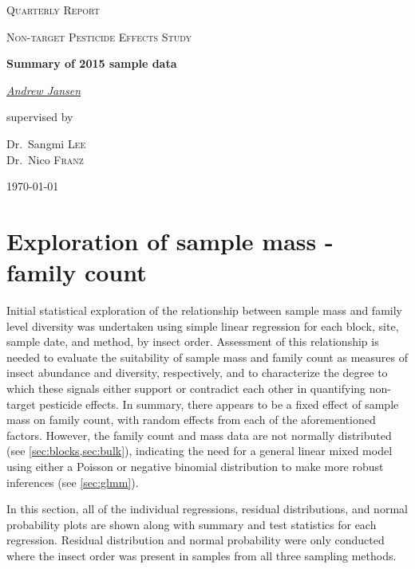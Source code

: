 \documentclass[10pt,letterpaper,twocolumn]{article}
\begin{document}
\begin{titlepage}
	\centering
	{\scshape\LARGE Quarterly Report\par}
	\vspace{1cm}
	{\scshape\Large Non-target Pesticide Effects Study\par}
	\vspace{1.5cm}
	{\huge\bfseries Summary of 2015 sample data\par}
	\vspace{2cm}
	{\Large\itshape {\href{mailto:majanse1@asu.edu}{Andrew Jansen}}\par}
	\vfill
	supervised by\par
	Dr.~Sangmi \textsc{Lee}\\
	Dr.~Nico \textsc{Franz}

	\vfill

	{\large \today\par}
\end{titlepage}

\section{Exploration of sample mass - family count}\label{sec:mass-vs-count}
Initial statistical exploration of the relationship between sample mass and family level diversity was undertaken using simple linear regression for each block, site, sample date, and method, by insect order.
Assessment of this relationship is needed to evaluate the suitability of sample mass and family count as measures of insect abundance and diversity, respectively, and to characterize the degree to which these signals either support or contradict each other in quantifying non-target pesticide effects.
In summary, there appears to be a fixed effect of sample mass on family count, with random effects from each of the aforementioned factors.
However, the family count and mass data are not normally distributed (see \cref{sec:blocks,sec:bulk}), indicating the need for a general linear mixed model using either a Poisson or negative binomial distribution to make more robust inferences (see \cref{sec:glmm}).

In this section, all of the individual regressions, residual distributions, and normal probability plots are shown along with summary and test statistics for each regression.
Residual distribution and normal probability were only conducted where the insect order was present in samples from all three sampling methods.
\end{document}
